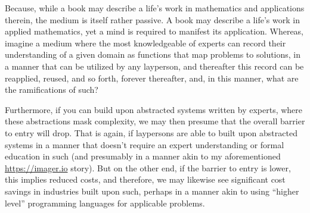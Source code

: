 Because, while a book may describe a life’s work in mathematics and applications therein, the medium is itself rather passive. A book may describe a life’s work in applied mathematics, yet a mind is required to manifest its application. Whereas, imagine a medium where the most knowledgeable of experts can record their understanding of a given domain as functions that map problems to solutions, in a manner that can be utilized by any layperson, and thereafter this record can be reapplied, reused, and so forth, forever thereafter, and, in this manner, what are the ramifications of such?

Furthermore, if you can build upon abstracted systems written by experts, where these abstractions mask complexity, we may then presume that the overall barrier to entry will drop. That is again, if laypersons are able to built upon abstracted systems in a manner that doesn't require an expert understanding or formal education in such (and presumably in a manner akin to my aforementioned \url{https://imager.io} story). But on the other end, if the barrier to entry is lower, this implies reduced costs, and therefore, we may likewise see significant cost savings in industries built upon such, perhaps in a manner akin to using ``higher level'' programming languages for applicable problems. 




















